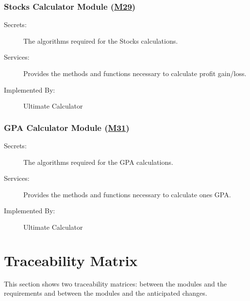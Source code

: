 \documentclass[12pt, titlepage]{article}
\begin{document}
\subsubsection{Stocks Calculator Module (\hyperref[m29]{M29})}

\begin{description}
\item[Secrets:]The algorithms required for the Stocks calculations.
\item[Services:] Provides the methods and functions necessary to calculate profit gain/loss.
\item[Implemented By:] Ultimate Calculator
\end{description}

\subsubsection{GPA Calculator Module (\hyperref[m31]{M31})}

\begin{description}
\item[Secrets:]The algorithms required for the GPA calculations.
\item[Services:] Provides the methods and functions necessary to calculate ones GPA.
\item[Implemented By:] Ultimate Calculator
\end{description}

\section{Traceability Matrix} \label{SecTM}

This section shows two traceability matrices: between the modules and the
requirements and between the modules and the anticipated changes.
\end{document}
